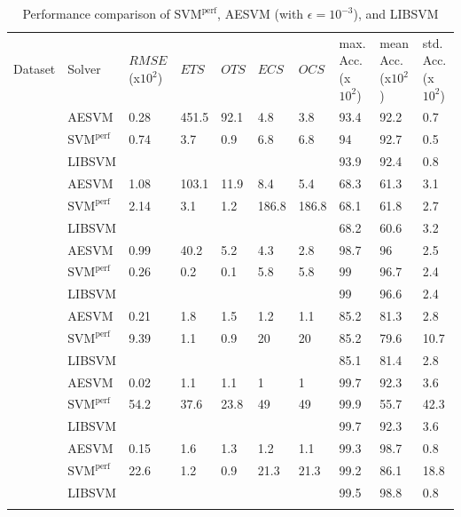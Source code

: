 \documentclass[twoside]{article}
\begin{document}
\begin{table}[h!]
\begin{center}
\begin{tabular}{|@{}p{1.2cm}!{\vrule width 1pt}@{}p{1.6cm}@{}!{\vrule width 1pt}@{}p{1.2cm}|@{}l|@{}l|@{}l|@{}l|@{}p{1.8cm}|@{}p{1.8cm}|@{}p{1.6cm}|} \hline
Dataset & Solver & $RMSE$ (x$10^2$) & $ETS$ & $OTS$ & $ECS$ & $OCS$ & max. Acc. (x$10^2$)& mean Acc. (x$10^2$)& std. Acc. (x$10^2$)\\ 
 &  AESVM & 0.28 & 451.5 & 92.1 & 4.8 & 3.8 & 93.4 & 92.2 & 0.7 \\ 
&$\text{SVM}^{\text{perf}}$ & 0.74 & 3.7 & 0.9 & 6.8 & 6.8 & 94 & 92.7 & 0.5 \\ 
& LIBSVM &   &  &  &  &  & 93.9 & 92.4 & 0.8\\ 
 &  AESVM &  1.08 & 103.1 & 11.9 & 8.4 & 5.4 & 68.3 & 61.3 & 3.1 \\ 
&$\text{SVM}^{\text{perf}}$ & 2.14 & 3.1 & 1.2 & 186.8 & 186.8 & 68.1 & 61.8 & 2.7 \\ 
& LIBSVM &   &  &  &  & & 68.2 & 60.6 & 3.2 \\ 
 &  AESVM &  0.99 & 40.2 & 5.2 & 4.3 & 2.8 & 98.7 & 96 & 2.5 \\ 
&$\text{SVM}^{\text{perf}}$ &  0.26 & 0.2 & 0.1 & 5.8 & 5.8 & 99 & 96.7 & 2.4 \\ 
& LIBSVM &  &  &  &  &  & 99 & 96.6 & 2.4\\ 
 &  AESVM &  0.21 & 1.8 & 1.5 & 1.2 & 1.1 & 85.2 & 81.3 & 2.8\\ 
&$\text{SVM}^{\text{perf}}$ &  9.39 & 1.1 & 0.9 & 20 & 20 & 85.2 & 79.6 & 10.7\\ 
& LIBSVM &   &  &  & &  & 85.1 & 81.4 & 2.8\\ 
 &  AESVM & 0.02 & 1.1 & 1.1 & 1 & 1 & 99.7 & 92.3 & 3.6\\ 
&$\text{SVM}^{\text{perf}}$ & 54.2 & 37.6 & 23.8 & 49 & 49 & 99.9 & 55.7 & 42.3 \\ 
& LIBSVM &  &  &  &  &  & 99.7 & 92.3 & 3.6\\ 
 &  AESVM &  0.15 & 1.6 & 1.3 & 1.2 & 1.1 & 99.3 & 98.7 & 0.8\\ 
&$\text{SVM}^{\text{perf}}$ & 22.6 & 1.2 & 0.9 & 21.3 & 21.3 & 99.2 & 86.1 & 18.8 \\ 
& LIBSVM &   &  &  &  &  & 99.5 & 98.8 & 0.8\\ 
\end{tabular}
\end{center}
\caption{Performance comparison of $\text{SVM}^{\text{perf}}$, AESVM (with $\epsilon = 10^{-3}$), and LIBSVM}
\label{tb:testing5}
\end{table}
\end{document}
